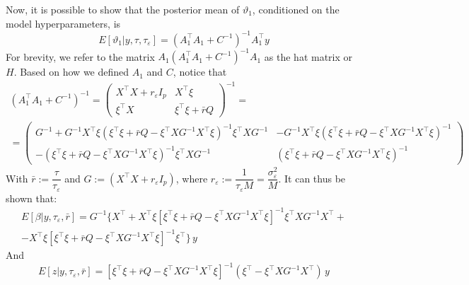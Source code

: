 \documentclass[openany]{book}
\begin{document}
Now, it is possible to show \citep{LindleySmith} that the posterior mean of $\vartheta_1$, conditioned on the model hyperparameters, is
%
\begin{equation}
E[\vartheta_1 | y, \tau, \tau_{\varepsilon}] =  \left( A_{1}^{\top}A_{1} + C^{-1} \right)^{-1}A_{1}^{\top}y
\end{equation}
%
For brevity, we refer to the matrix $A_1 \left( A_{1}^{\top}A_{1} + C^{-1} \right)^{-1}A_{1}$ as the hat matrix or $H$. Based on how we defined $A_1$ and $C$, notice that
\begin{align*}
\left( A_{1}^{\top}A_{1} + C^{-1} \right)^{-1} = 
\begin{pmatrix}
 X^{\top}X + r_{\varepsilon} I_p & X^{\top} \xi \\
 \xi ^{\top} X & \xi^{\top} \xi + \bar{r} Q
\end{pmatrix}^{-1} = \\ =
\begin{pmatrix}
G^{-1} + G^{-1} X^{\top} \xi(\xi ^{\top} \xi + \bar{r} Q - \xi ^{\top} X G^{-1} X^{\top} \xi)^{-1} \xi ^{\top} XG^{-1} & 
-G^{-1} X^{\top} \xi(\xi ^{\top} \xi + \bar{r} Q - \xi ^{\top} X G^{-1} X^{\top} \xi)^{-1}\\
-  (\xi ^{\top} \xi + \bar{r} Q - \xi ^{\top} X G^{-1} X^{\top} \xi)^{-1} \xi^{\top} X G^{-1} & 
 (\xi ^{\top} \xi + \bar{r} Q - \xi ^{\top} X G^{-1} X^{\top} \xi)^{-1}
\end{pmatrix}
\end{align*}
With $\bar{r} := \dfrac{\tau}{\tau_{\varepsilon}}$ and $G := (X^{\top}X + r_{\varepsilon}I_p)$, where $r_{\varepsilon} := \dfrac{1}{\tau_{\varepsilon}M} = \dfrac{\sigma_{\varepsilon}^{2}}{M}$.
It can thus be shown that:
\begin{equation}
\begin{aligned}
E[\beta | y, \tau_{\varepsilon}, \bar{r}] = G^{-1} \lbrace X^{\top} 
+ X^{\top} \xi \left[ \xi^{\top} \xi + \bar{r} Q - \xi ^{\top} X G^{-1} X^{\top} \xi \right]^{-1} \xi^{\top} X G^{-1} X^{\top} +\\
- X^{\top} \xi \left[ \xi^{\top} \xi + \bar{r} Q - \xi ^{\top} X G^{-1} X^{\top} \xi \right]^{-1} \xi^{\top}
\rbrace \, y
\end{aligned}
\end{equation}
And
\begin{equation}
E[z | y, \tau_{\varepsilon}, \bar{r}] = \left[ \xi^{\top} \xi + \bar{r} Q - \xi ^{\top} X G^{-1} X^{\top} \xi \right]^{-1}
(\xi^{\top} - \xi^{\top} X G^{-1} X^{\top}) \, y
\end{equation}
\end{document}

